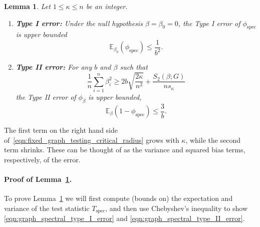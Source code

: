 \documentclass{article}
\newcommand{\1}{\mathbf{1}}
\newcommand{\spec}{\mathrm{spec}}
\theoremstyle{alden}
\theoremstyle{aldenthm}
\newtheorem{lemma}{Lemma}
\theoremstyle{definition}
\theoremstyle{remark}
\begin{document}
\begin{lemma}
	\label{lem:fixed_graph_testing}
	Let $1 \leq \kappa \leq n$ be an integer.
	\begin{enumerate}
		\item \textbf{Type I error:} Under the null hypothesis $\beta = \beta_0 = 0$, the Type I error of $\phi_{\spec}$ is upper bounded
		\begin{equation}
		\label{eqn:graph_spectral_type_I_error}
		\mathbb{E}_{\beta_0}(\phi_{\spec}) \leq \frac{1}{b^2}.
		\end{equation}
		\item \textbf{Type II error:} For any $b$ and $\beta$ such that
		\begin{equation}
		\label{eqn:fixed_graph_testing_critical_radius}
		\frac{1}{n} \sum_{i = 1}^{n} \beta_i^2 \geq 2b\sqrt{\frac{2\kappa}{n^2}} + \frac{S_2(\beta;G)}{ns_{\kappa}}
		\end{equation}
		the Type II error of $\phi_{\beta}$ is upper bounded,
		\begin{equation}
		\label{eqn:graph_spectral_type_II_error}
		\mathbb{E}_{\beta}(1 - \phi_{\spec}) \leq \frac{3}{b}.
		\end{equation}
	\end{enumerate}
\end{lemma}

The first term on the right hand side of~\eqref{eqn:fixed_graph_testing_critical_radius} grows with $\kappa$, while the second term shrinks. These can be thought of as the variance and squared bias terms, respectively, of the error.

\paragraph{Proof of Lemma~\ref{lem:fixed_graph_testing}.}

To prove Lemma~\ref{lem:fixed_graph_testing} we will first compute (bounds on) the expectation and variance of the test statistic $T_{\mathrm{spec}}$, and then use Chebyshev's inequality to show \eqref{eqn:graph_spectral_type_I_error} and \eqref{eqn:graph_spectral_type_II_error}.

\vspace{.2 in}
\end{document}
